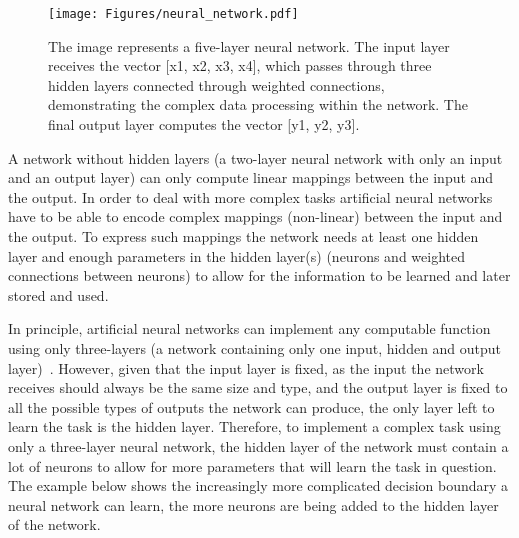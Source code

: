 \begin{figure}[ht!]
	\begin{center}
		\texttt{[image: Figures/neural\_network.pdf]}
	\end{center}
	\caption{The image represents a five-layer neural network. The input layer receives the vector [x1, x2, x3, x4], which passes through three hidden layers connected through weighted connections, demonstrating the complex data processing within the network. The final output layer computes the vector [y1, y2, y3].}
	\label{fig:neural}
\end{figure} 

A network without hidden layers (\ie a two-layer neural network with only an input and an output layer) can only compute linear mappings between the input and the output. In order to deal with more complex tasks artificial neural networks have to be able to encode complex mappings (\ie non-linear) between the input and the output. To express such mappings the network needs at least one hidden layer and enough parameters in the hidden layer(s) (\ie neurons and weighted connections between neurons) to allow for the information to be learned and later stored and used. 


In principle, artificial neural networks can implement any computable function using only three-layers (\ie a network containing only one input, hidden and output layer)~\cite{Hornik91}. However, given that the input layer is fixed, as the input the network receives should always be the same size and type, and the output layer is fixed to all the possible types of outputs the network can produce, the only layer left to learn the task is the hidden layer. Therefore, to implement a complex task using only a three-layer neural network, the hidden layer of the network must contain a lot of neurons to allow for more parameters that will learn the task in question. The example below shows the increasingly more complicated decision boundary a neural network can learn, the more neurons are being added to the hidden layer of the network.



